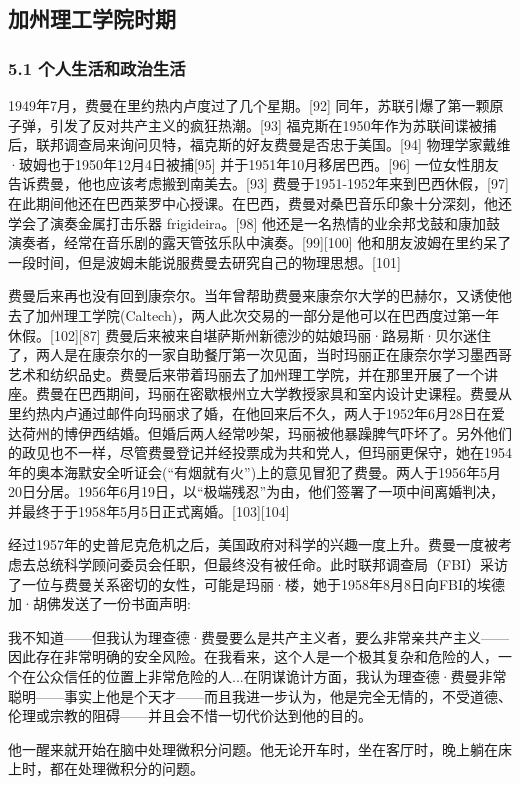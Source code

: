 \subsection{加州理工学院时期}
\subsubsection{5.1 个人生活和政治生活}
1949年7月，费曼在里约热内卢度过了几个星期。[92] 同年，苏联引爆了第一颗原子弹，引发了反对共产主义的疯狂热潮。[93] 福克斯在1950年作为苏联间谍被捕后，联邦调查局来询问贝特，福克斯的好友费曼是否忠于美国。[94] 物理学家戴维·玻姆也于1950年12月4日被捕[95] 并于1951年10月移居巴西。[96] 一位女性朋友告诉费曼，他也应该考虑搬到南美去。[93] 费曼于1951-1952年来到巴西休假，[97] 在此期间他还在巴西莱罗中心授课。在巴西，费曼对桑巴音乐印象十分深刻，他还学会了演奏金属打击乐器 frigideira。[98] 他还是一名热情的业余邦戈鼓和康加鼓演奏者，经常在音乐剧的露天管弦乐队中演奏。[99][100] 他和朋友波姆在里约呆了一段时间，但是波姆未能说服费曼去研究自己的物理思想。[101]

费曼后来再也没有回到康奈尔。当年曾帮助费曼来康奈尔大学的巴赫尔，又诱使他去了加州理工学院(Caltech)，两人此次交易的一部分是他可以在巴西度过第一年休假。[102][87] 费曼后来被来自堪萨斯州新德沙的姑娘玛丽·路易斯·贝尔迷住了，两人是在康奈尔的一家自助餐厅第一次见面，当时玛丽正在康奈尔学习墨西哥艺术和纺织品史。费曼后来带着玛丽去了加州理工学院，并在那里开展了一个讲座。费曼在巴西期间，玛丽在密歇根州立大学教授家具和室内设计史课程。费曼从里约热内卢通过邮件向玛丽求了婚，在他回来后不久，两人于1952年6月28日在爱达荷州的博伊西结婚。但婚后两人经常吵架，玛丽被他暴躁脾气吓坏了。另外他们的政见也不一样，尽管费曼登记并经投票成为共和党人，但玛丽更保守，她在1954年的奥本海默安全听证会(“有烟就有火”)上的意见冒犯了费曼。两人于1956年5月20日分居。1956年6月19日，以“极端残忍”为由，他们签署了一项中间离婚判决，并最终于于1958年5月5日正式离婚。[103][104]

经过1957年的史普尼克危机之后，美国政府对科学的兴趣一度上升。费曼一度被考虑去总统科学顾问委员会任职，但最终没有被任命。此时联邦调查局（FBI）采访了一位与费曼关系密切的女性，可能是玛丽·楼，她于1958年8月8日向FBI的埃德加·胡佛发送了一份书面声明:

我不知道——但我认为理查德·费曼要么是共产主义者，要么非常亲共产主义——因此存在非常明确的安全风险。在我看来，这个人是一个极其复杂和危险的人，一个在公众信任的位置上非常危险的人...在阴谋诡计方面，我认为理查德·费曼非常聪明——事实上他是个天才——而且我进一步认为，他是完全无情的，不受道德、伦理或宗教的阻碍——并且会不惜一切代价达到他的目的。

他一醒来就开始在脑中处理微积分问题。他无论开车时，坐在客厅时，晚上躺在床上时，都在处理微积分的问题。

